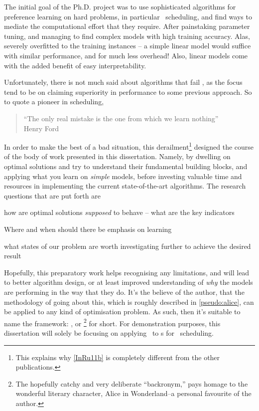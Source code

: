 The initial goal of the Ph.D. project was to use sophisticated algorithms for 
preference learning on hard problems, in particular \jsp\ scheduling, and find 
ways to mediate the computational effort that they require.
After painstaking parameter tuning, and managing to find complex models 
with high training accuracy. Alas, severely overfitted to the training 
instances -- a simple linear model would suffice with similar performance, and 
for much less overhead! Also, linear models come with the added benefit of easy 
interpretability. 

Unfortunately, there is not much said about algorithms that fail 
\citep{SmithMiles2015}, as the focus tend to be on claiming superiority in 
performance to some previous approach.
So to quote a pioneer in scheduling, 
\begin{quote}
    ``The only real mistake is the one from which we learn nothing'' \\
    \raggedleft Henry Ford
\end{quote}
In order to make the best of a bad situation, this derailment\footnote{
    This explains why \cref{InRu11b} is completely different from the other 
    publications.} 
designed the course of the body of work presented in this dissertation. 
Namely, by dwelling on optimal solutions and try to understand 
their fundamental building blocks, and applying what you learn on \emph{simple} 
models, before investing valuable time and resources in implementing the 
current state-of-the-art algorithms. 
The research questions that are put forth are
\begin{enumerate*}[itemjoin={{? }}, itemjoin*={{? And ultimately, }},
    after={{?}}]
    \item how are optimal solutions \emph{supposed} to behave -- what are the 
    key indicators
    \item Where and when should there be emphasis on learning
    \item what states of our problem are worth investigating further to achieve 
    the desired result
\end{enumerate*}

Hopefully, this preparatory work helps recognising any limitations, and will 
lead to better algorithm design, or at least improved understanding of 
\emph{why} the models are performing in the way that they do.
It's the believe of the author, that the methodology of going about this, which 
is roughly described in \cref{pseudo:alice}, can be applied to any kind of 
optimisation problem. As such, then it's suitable to name the framework:
\emph{\fullnameAlice}, or \Alice\footnote{
    The hopefully catchy and very deliberate ``backronym,'' pays homage to 
    the wonderful literary character, Alice in Wonderland--a personal 
    favourite of the author.} 
for short. 
For demonstration purposes, this dissertation will solely be 
focusing on applying \Alice\ to \dr s for \jsp\ scheduling.

